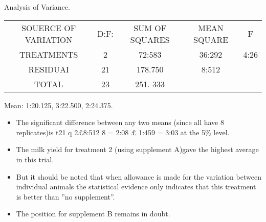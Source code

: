 \documentclass[a4paper,12pt]{article}
\begin{document}
\begin{enumerate}
Analysis of Variance.
\begin{center}
 \begin{tabular}{|c|c|c|c|c|}
SOUERCE OF VARIATION & D:F: & SUM OF SQUARES & MEAN SQUARE & F \\
TREATMENTS & 2 & 72:583&  36:292&   4:26\\
RESIDUAI & 21&  178.750 & 8:512&  \\
TOTAL & 23 & 251. 333& & \\
\end{tabular}   
\end{center}




Mean: 1:20.125, 3:22.500, 2:24.375.

\begin{itemize}
    \item The significant difference between any two means
(since all have 8 replicates)is t21
q
2£8:512
8 = 2:08 £ 1:459 = 3:03 at the 5\% level.
\item The milk yield for treatment 2 (using supplement A)gave the highest average in this
trial. 
\item But it should be noted that when allowance is made for the variation between
individual animals the statistical evidence only indicates that this treatment is better
than ”no supplement”. 
\item The position for supplement B remains in doubt.
\end{itemize}

\end{enumerate}
\end{document}
